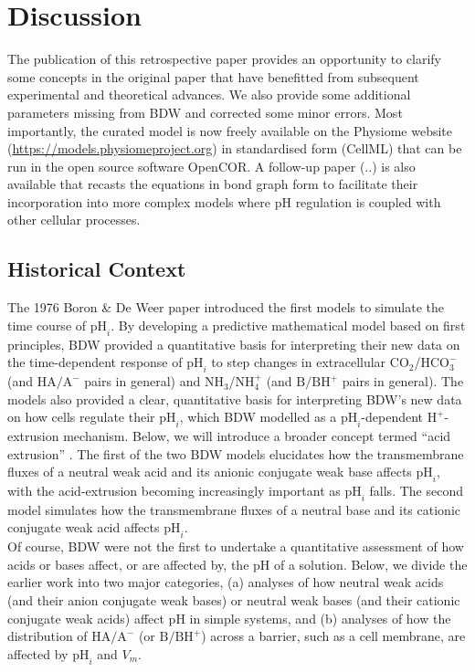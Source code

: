 \documentclass[fleqn,10pt]{physiome}
\begin{document}
\section{Discussion}

The publication of this retrospective paper provides an opportunity to clarify some concepts in the original paper that have benefitted from subsequent experimental and theoretical advances. We also provide some additional parameters missing from BDW and corrected some minor errors. Most importantly, the curated model is now freely available on the Physiome website (\url{https://models.physiomeproject.org}) in standardised form (CellML) that can be run in the open source software OpenCOR. A follow-up paper (..) is also available that recasts the equations in bond graph form to facilitate their incorporation into more complex models where $\mathrm{pH}$ regulation is coupled with other cellular processes.

\subsection{Historical Context}

The 1976 Boron \& De Weer paper introduced the first models to simulate the time course of $\mathrm{pH}_i$. By developing a predictive mathematical model based on first principles, BDW provided a quantitative basis for interpreting their new data on the time-dependent response of $\mathrm{pH}_i$ to step changes in extracellular $\mathrm{CO_2}$/$\mathrm{HCO_3^-}$ (and $\mathrm{HA/A^-}$ pairs in general) and $\mathrm{NH_3}$/$\mathrm{NH_4^+}$ (and $\mathrm{B/BH^+}$ pairs in general). The models also provided a clear, quantitative basis for interpreting BDW's new data on how cells regulate their $\mathrm{pH}_i$, which BDW modelled as a $\mathrm{pH}_i$-dependent $\mathrm{H^+}$-extrusion mechanism. Below, we will introduce a broader concept termed ``acid extrusion'' \citep{boron1977intracellular}. The first of the two BDW models elucidates how the transmembrane fluxes of a neutral weak acid and its anionic conjugate weak base affects $\mathrm{pH}_i$, with the acid-extrusion becoming increasingly important as $\mathrm{pH}_i$ falls. The second model simulates how the transmembrane fluxes of a neutral base and its cationic conjugate weak acid affects $\mathrm{pH}_i$.\\

Of course, BDW were not the first to undertake a quantitative assessment of how acids or bases affect, or are affected by, the $\mathrm{pH}$ of a solution. Below, we divide the earlier work into two major categories, (a) analyses of how neutral weak acids (and their anion conjugate weak bases) or neutral weak bases (and their cationic conjugate weak acids) affect $\mathrm{pH}$ in simple systems, and (b) analyses of how the distribution of $\mathrm{HA/A^-}$ (or $\mathrm{B/BH^+}$) across a barrier, such as a cell membrane, are affected by $\mathrm{pH}_i$ and $V_m$.
\end{document}
